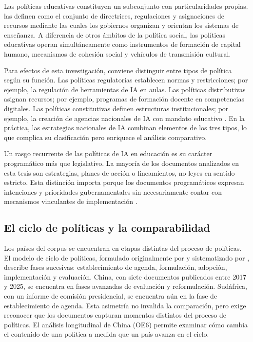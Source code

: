 Las políticas educativas constituyen un subconjunto con particularidades propias. \citet{rizvi2010globalizing} las definen como el conjunto de directrices, regulaciones y asignaciones de recursos mediante las cuales los gobiernos organizan y orientan los sistemas de enseñanza. A diferencia de otros ámbitos de la política social, las políticas educativas operan simultáneamente como instrumentos de formación de capital humano, mecanismos de cohesión social y vehículos de transmisión cultural.

Para efectos de esta investigación, conviene distinguir entre tipos de política según su función. Las políticas regulatorias establecen normas y restricciones; por ejemplo, la regulación de herramientas de IA en aulas. Las políticas distributivas asignan recursos; por ejemplo, programas de formación docente en competencias digitales. Las políticas constitutivas definen estructuras institucionales; por ejemplo, la creación de agencias nacionales de IA con mandato educativo \citep{rizvi2010globalizing}. En la práctica, las estrategias nacionales de IA combinan elementos de los tres tipos, lo que complica su clasificación pero enriquece el análisis comparativo.

Un rasgo recurrente de las políticas de IA en educación es su carácter programático más que legislativo. La mayoría de los documentos analizados en esta tesis son estrategias, planes de acción o lineamientos, no leyes en sentido estricto. Esta distinción importa porque los documentos programáticos expresan intenciones y prioridades gubernamentales sin necesariamente contar con mecanismos vinculantes de implementación \citep{fatima2020aipolicy}.

\subsection{El ciclo de políticas y la comparabilidad}

Los países del corpus se encuentran en etapas distintas del proceso de políticas. El modelo de ciclo de políticas, formulado originalmente por \citet{lasswell1951policy} y sistematizado por \citet{howlett2003studying}, describe fases sucesivas: establecimiento de agenda, formulación, adopción, implementación y evaluación. China, con siete documentos publicados entre 2017 y 2025, se encuentra en fases avanzadas de evaluación y reformulación. Sudáfrica, con un informe de comisión presidencial, se encuentra aún en la fase de establecimiento de agenda. Esta asimetría no invalida la comparación, pero exige reconocer que los documentos capturan momentos distintos del proceso de políticas. El análisis longitudinal de China (OE6) permite examinar cómo cambia el contenido de una política a medida que un país avanza en el ciclo.

